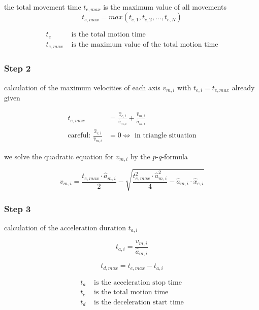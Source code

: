 \documentclass[%
  professionalfonts,%
  xcolor={%
    usenames,%
    dvipsnames,%
    svgnames,%
    table,%
    hyperref%
  }%
]{beamer}
\begin{document}
\begin{frame}
the total movement time $t_{e,max}$ is the maximum value of all movements
\begin{equation*}
t_{e,max} = max(t_{e,1},t_{e,2},...,t_{e,N})
\end{equation*}

\begin{align*}
t_{e} & \text{ is the total motion time } \\
t_{e,max} & \text{ is the maximum value of the total motion time}      
\end{align*}
\end{frame}
  
\subsubsection{Step 2}
\begin{frame}
calculation of the maximum velocities of each axis $v_{m,i}$ with $t_{e,i} = t_{e,max}$ already given

\begin{align*}
t_{e,max} & = \frac{\hat{x}_{e,i}}{\hat{v}_{m,i}}+\frac{\hat{v}_{m,i}}{\hat{a}_{m,i}} \\
\text{careful: } \frac{\hat{x}_{e,i}}{\hat{v}_{m,i}} & = 0 \iff \text{ in triangle situation}
\end{align*}

we solve the quadratic equation for $v_{m,i}$ by the $p$-$q$-formula

\begin{equation*}
v_{m,i} = \frac{t_{e,max} \cdot \hat{a}_{m,i}}{2}-\sqrt{\frac{t_{e,max}^2 \cdot \hat{a}_{m,i}^2}{4}-\hat{a}_{m,i}\cdot \hat{x}_{e,i}}
\end{equation*}

\end{frame}
  
\subsubsection{Step 3}
\begin{frame}
calculation of the acceleration duration $t_{a,i}$

\begin{equation*}
t_{a,i} = \frac{v_{m,i}}{\hat{a}_{m,i}}
\end{equation*}

\begin{equation}
t_{d,max} = t_{e,max}-t_{a,i}
\end{equation}      

\begin{align*}
t_{a} & \text{ is the acceleration stop time} \\
t_{e} & \text{ is the total motion time} \\
t_{d} & \text{ is the deceleration start time}
\end{align*}
\end{frame}
\end{document}
